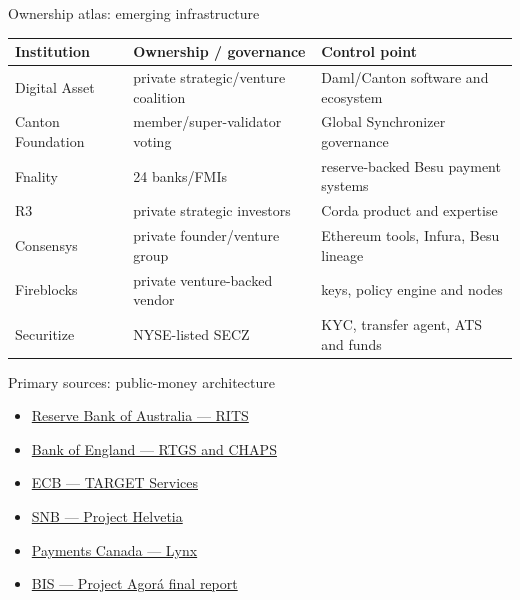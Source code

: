 \documentclass[aspectratio=169,12pt]{beamer}
\newcommand{\verytightitems}{\setlength{\itemsep}{0.22em}\setlength{\parskip}{0pt}}
\begin{document}
\begin{frame}{Ownership atlas: emerging infrastructure}
  \fontsize{8.8}{10.5}\selectfont
  \begin{tabularx}{\textwidth}{L{1.75cm}Y Y}
    \toprule
    \textbf{Institution} & \textbf{Ownership / governance} & \textbf{Control point} \\
    \midrule
    Digital Asset & private strategic/venture coalition & Daml/Canton software and ecosystem \\
    Canton Foundation & member/super-validator voting & Global Synchronizer governance \\
    Fnality & 24 banks/FMIs & reserve-backed Besu payment systems \\
    R3 & private strategic investors & Corda product and expertise \\
    Consensys & private founder/venture group & Ethereum tools, Infura, Besu lineage \\
    Fireblocks & private venture-backed vendor & keys, policy engine and nodes \\
    Securitize & NYSE-listed SECZ & KYC, transfer agent, ATS and funds \\
    \bottomrule
  \end{tabularx}
\end{frame}

\begin{frame}{Primary sources: public-money architecture}
  \fontsize{8.1}{9.7}\selectfont
  \begin{itemize}\verytightitems
    \item \href{https://www.rba.gov.au/payments-and-infrastructure/rits/about.html}{Reserve Bank of Australia --- RITS}
    \item \href{https://www.bankofengland.co.uk/payment-and-settlement/a-brief-introduction-to-the-real-time-gross-settlement-system-and-chaps}{Bank of England --- RTGS and CHAPS}
    \item \href{https://www.ecb.europa.eu/paym/target/html/index.en.html}{ECB --- TARGET Services}
    \item \href{https://www.snb.ch/en/the-snb/mandates-goals/payment-transactions/projekt_helvetia}{SNB --- Project Helvetia}
    \item \href{https://www.payments.ca/systems-services/payment-systems/high-value-payment-system-lynx}{Payments Canada --- Lynx}
    \item \href{https://www.bis.org/publ/othp110.pdf}{BIS --- Project Agor\'a final report}
  \end{itemize}
\end{frame}
\end{document}
